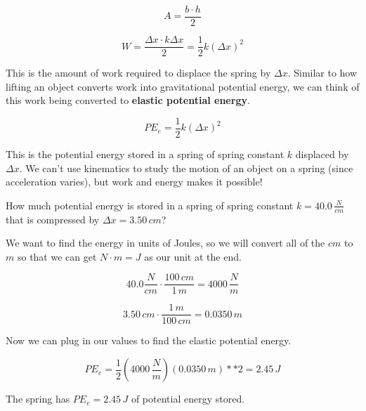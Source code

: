 \documentclass[12pt]{book}
\begin{document}
\begin{equation}
A = \frac{b \cdot h}{2}
\end{equation} 

\begin{equation}
W = \frac{\Delta x \cdot k \Delta x}{2} = \frac{1}{2}k (\Delta x)^2
\end{equation}

This is the amount of work required to displace the spring by $\Delta x$. Similar to how lifting an object converts work into gravitational potential energy, we can think of this work being converted to \textbf{elastic potential energy}.

\begin{equation}
PE_e = \frac{1}{2} k (\Delta x)^2
\end{equation}

This is the potential energy stored in a spring of spring constant $k$ displaced by $\Delta x$. We can't use kinematics to study the motion of an object on a spring (since acceleration varies), but work and energy makes it possible!

\begin{exampleblock}

How much potential energy is stored in a spring of spring constant $k = 40.0 \, \frac{N}{cm}$ that is compressed by $\Delta x = 3.50 \, cm$? 

\hspace{10pt}

We want to find the energy in units of Joules, so we will convert all of the $cm$ to $m$ so that we can get $N \cdot m = J$ as our unit at the end.

\begin{equation}
40.0 \frac{N}{cm} \cdot \frac{100 \, cm}{1 \, m} = 4000 \, \frac{N}{m}
\end{equation}

\begin{equation}
3.50 \, cm	\cdot \frac{1 \, m}{100 \, cm} = 0.0350 \, m
\end{equation}

Now we can plug in our values to find the elastic potential energy.

\begin{equation}
PE_e = \frac{1}{2} (4000 \, \frac{N}{m}) (0.0350 \, m)**2 = 2.45 \, J
\end{equation}

The spring has $PE_e = 2.45 \, J$ of potential energy stored.

\end{exampleblock}
\end{document}

